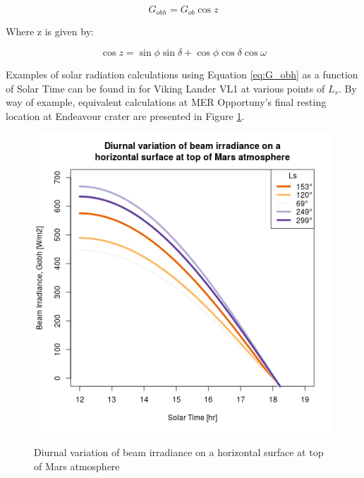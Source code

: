 \begin{equation}
  \label{eq:G_obh}
  G_{obh} = G_{ob}\cos{z}
\end{equation}

Where z is given by:

\begin{equation}
  \label{eq:cosz}
  \cos{z} = \sin{\phi}\sin{\delta} + \cos{\phi}\cos{\delta}\cos{\omega}
\end{equation}

Examples of solar radiation calculations using Equation \ref{eq:G_obh} as a function of Solar Time can be found in  for Viking Lander VL1 at various points of $L_s$. By way of example, equivalent calculations at MER Opportuny's final resting location at Endeavour crater are presented in Figure \ref{fig:plot:diurnal-variation-of-beam-irradiance-on-a-horizontal-surface-at-top-of-mars-atmosphere}.

\begin{figure}[H]
  \centering
  \hypersetup{linkcolor=captionTextColor}
  \includegraphics[width=0.8\linewidth]{sections/martian-environment/plots/diurnal-variation-of-beam-irradiance-on-a-horizontal-surface-at-top-of-mars-atmosphere.png}\\
  \caption[Diurnal variation of beam irradiance on a horizontal surface at top of Mars atmosphere]
  {Diurnal variation of beam irradiance on a horizontal surface at top of Mars atmosphere}
  \label{fig:plot:diurnal-variation-of-beam-irradiance-on-a-horizontal-surface-at-top-of-mars-atmosphere}
\end{figure}

